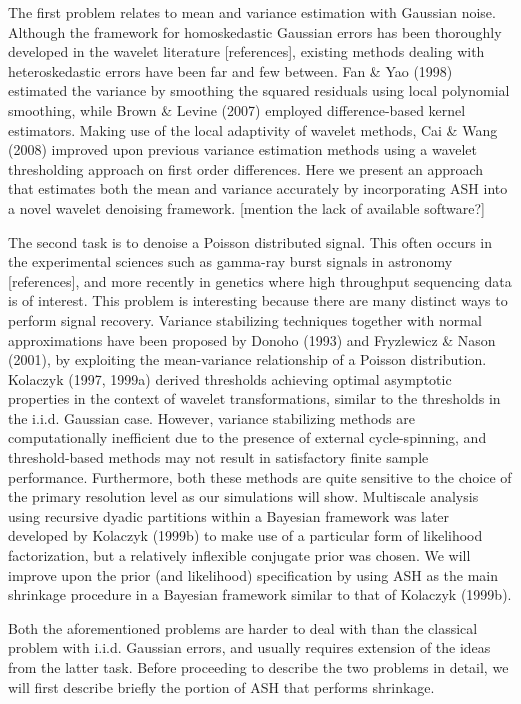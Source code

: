 \documentclass[12pt]{article}
\begin{document}
The first problem relates to mean and variance estimation with Gaussian noise. Although the framework for homoskedastic Gaussian errors has been thoroughly developed in the wavelet literature [references], existing methods dealing with heteroskedastic errors have been far and few between. Fan \& Yao (1998) estimated the variance by smoothing the squared residuals using local polynomial smoothing, while Brown \& Levine (2007) employed difference-based kernel estimators. Making use of the local adaptivity of wavelet methods, Cai \& Wang (2008) improved upon previous variance estimation methods using a wavelet thresholding approach on first order differences. Here we present an approach that estimates both the mean and variance accurately by incorporating ASH into a novel wavelet denoising framework. [mention the lack of available software?]

The second task is to denoise a Poisson distributed signal. This often occurs in the experimental sciences such as gamma-ray burst signals in astronomy [references], and more recently in genetics where high throughput sequencing data is of interest. This problem is interesting because there are many distinct ways to perform signal recovery. Variance stabilizing techniques together with normal approximations have been proposed by Donoho (1993) and Fryzlewicz \& Nason (2001), by exploiting the mean-variance relationship of a Poisson distribution. Kolaczyk (1997, 1999a) derived thresholds achieving optimal asymptotic properties in the context of wavelet transformations, similar to the thresholds in the i.i.d. Gaussian case.  However, variance stabilizing methods are computationally inefficient due to the presence of external cycle-spinning, and threshold-based methods may not result in satisfactory finite sample performance. Furthermore, both these methods are quite sensitive to the choice of the primary resolution level as our simulations will show. Multiscale analysis using recursive dyadic partitions within a Bayesian framework was later developed by Kolaczyk (1999b) to make use of a particular form of likelihood factorization, but a relatively inflexible conjugate prior was chosen. We will improve upon the prior (and likelihood) specification by using ASH as the main shrinkage procedure in a Bayesian framework similar to that of Kolaczyk (1999b).

Both the aforementioned problems are harder to deal with than the classical problem with i.i.d. Gaussian errors, and usually requires extension of the ideas from the latter task. Before proceeding to describe the two problems in detail, we will first describe briefly the portion of ASH that performs shrinkage. 
\end{document}
